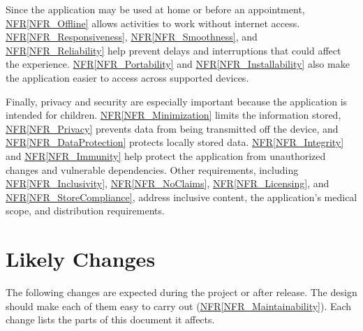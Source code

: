 \documentclass[10pt]{article}
\newcommand{\nfrref}[1]{\hyperref[#1]{NFR\ref*{#1}}}
\begin{document}
Since the application may be used at home or before an appointment,
\nfrref{NFR_Offline} allows activities to work without internet access.
\nfrref{NFR_Responsiveness}, \nfrref{NFR_Smoothness}, and
\nfrref{NFR_Reliability} help prevent delays and interruptions that could
affect the experience. \nfrref{NFR_Portability} and
\nfrref{NFR_Installability} also make the application easier to access
across supported devices.

Finally, privacy and security are especially important because the
application is intended for children. \nfrref{NFR_Minimization} limits
the information stored, \nfrref{NFR_Privacy} prevents data from being
transmitted off the device, and \nfrref{NFR_DataProtection} protects
locally stored data. \nfrref{NFR_Integrity} and \nfrref{NFR_Immunity}
help protect the application from unauthorized changes and vulnerable
dependencies. Other requirements, including \nfrref{NFR_Inclusivity}, \nfrref{NFR_NoClaims}, \nfrref{NFR_Licensing}, and
\nfrref{NFR_StoreCompliance}, address inclusive content, the application's
medical scope, and distribution requirements.

\newpage
\section{Likely Changes}
\label{sec_LikelyChanges}

The following changes are expected during the project or after release. The
design should make each of them easy to carry out
(\nfrref{NFR_Maintainability}). Each change lists the parts of this document
it affects.
\end{document}
